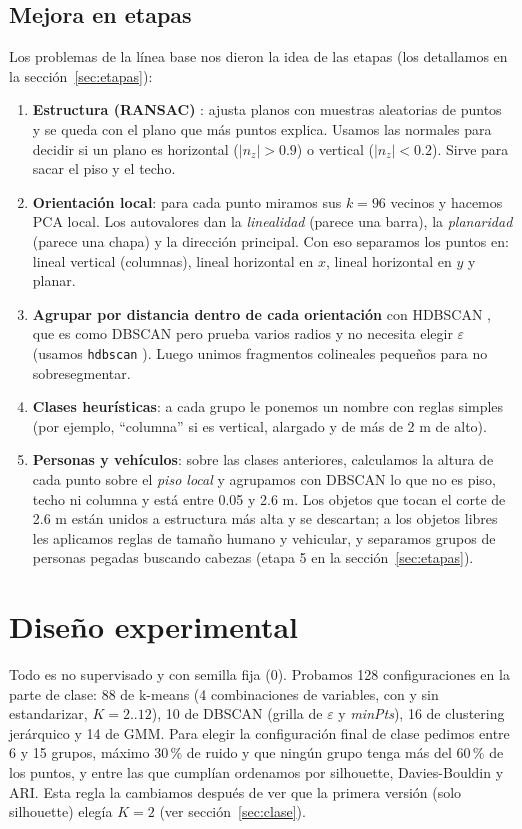 \documentclass[10pt,a4paper]{article}
\begin{document}
\subsection{Mejora en etapas}
Los problemas de la línea base nos dieron la idea de las etapas (los detallamos en la
sección~\ref{sec:etapas}):
\begin{enumerate}
\item \textbf{Estructura (RANSAC)} \cite{fischler1981}: ajusta planos con muestras
aleatorias de puntos y se queda con el plano que más puntos explica. Usamos las normales para
decidir si un plano es horizontal ($|n_z|>0.9$) o vertical ($|n_z|<0.2$). Sirve para sacar el
piso y el techo.
\item \textbf{Orientación local}: para cada punto miramos sus $k=96$ vecinos y hacemos PCA
local. Los autovalores dan la \textit{linealidad} (parece una barra), la \textit{planaridad}
(parece una chapa) y la dirección principal. Con eso separamos los puntos en: lineal vertical
(columnas), lineal horizontal en $x$, lineal horizontal en $y$ y planar.
\item \textbf{Agrupar por distancia dentro de cada orientación} con HDBSCAN
\cite{campello2013}, que es como DBSCAN pero prueba varios radios y no necesita elegir
$\varepsilon$ (usamos \texttt{hdbscan} \cite{mcinnes2017}). Luego unimos fragmentos
colineales pequeños para no sobresegmentar.
\item \textbf{Clases heurísticas}: a cada grupo le ponemos un nombre con reglas
simples (por ejemplo, ``columna'' si es vertical, alargado y de más de 2 m de alto).
\item \textbf{Personas y vehículos}: sobre las clases anteriores, calculamos la altura de
cada punto sobre el \textit{piso local} y agrupamos con DBSCAN lo que no es piso, techo ni
columna y está entre 0.05 y 2.6 m. Los objetos que tocan el corte de 2.6 m están unidos a
estructura más alta y se descartan; a los objetos libres les aplicamos reglas de tamaño
humano y vehicular, y separamos grupos de personas pegadas buscando cabezas (etapa 5 en la
sección~\ref{sec:etapas}).
\end{enumerate}

\section{Diseño experimental}
Todo es no supervisado y con semilla fija (0). Probamos 128 configuraciones en la parte de
clase: 88 de k-means (4 combinaciones de variables, con y sin estandarizar, $K=2..12$), 10 de
DBSCAN (grilla de $\varepsilon$ y \textit{minPts}), 16 de clustering jerárquico y 14 de GMM.
Para elegir la configuración final de clase pedimos entre 6 y 15 grupos, máximo 30\,\% de
ruido y que ningún grupo tenga más del 60\,\% de los puntos, y entre las que cumplían
ordenamos por silhouette, Davies-Bouldin y ARI. Esta regla la cambiamos después de ver que
la primera versión (solo silhouette) elegía $K=2$ (ver sección~\ref{sec:clase}).
\end{document}
